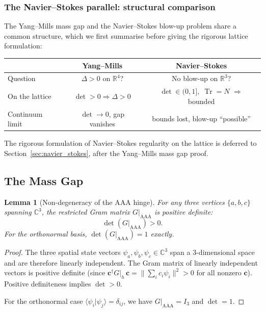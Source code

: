 \documentclass[12pt]{article}
\newtheorem{lemma}[theorem]{Lemma}
\theoremstyle{remark}
\theoremstyle{definition}
\newcommand{\CC}{\mathbb{C}}
\newcommand{\RR}{\mathbb{R}}
\newcommand{\tr}{\operatorname{Tr}}
\begin{document}
\subsubsection{The Navier--Stokes parallel: structural comparison}
\label{sec:navier_stokes_parallel}

The Yang--Mills mass gap and the Navier--Stokes blow-up problem share
a common structure, which we first summarise before giving the
rigorous lattice formulation:

\begin{center}
\begin{tabular}{lcc}
\hline
& Yang--Mills & Navier--Stokes \\
\hline
Question & $\Delta > 0$ on $\RR^4$? & No blow-up on $\RR^3$? \\
On the lattice & $\det > 0 \Rightarrow \Delta > 0$ &
  $\det \in (0,1],\;\tr = N$ $\Rightarrow$ bounded \\
Continuum limit & $\det \to 0$, gap vanishes &
  bounds lost, blow-up ``possible'' \\
\hline
\end{tabular}
\end{center}

The rigorous formulation of Navier--Stokes regularity on the lattice
is deferred to Section~\ref{sec:navier_stokes}, after the Yang--Mills
mass gap proof.

\subsection{The Mass Gap}
\label{sec:massgap}

\begin{lemma}[Non-degeneracy of the AAA hinge]
\label{lem:det}
For any three vertices $\{a, b, c\}$ spanning $\CC^3$, the
restricted Gram matrix $G|_{\mathrm{AAA}}$ is positive definite:
\begin{equation}
\det(G|_{\mathrm{AAA}}) > 0.
\end{equation}
For the orthonormal basis, $\det(G|_{\mathrm{AAA}}) = 1$ exactly.
\end{lemma}

\begin{proof}
The three spatial state vectors $\psi_a, \psi_b, \psi_c \in \CC^3$
span a 3-dimensional space and are therefore linearly independent.
The Gram matrix of linearly independent vectors is positive definite
(since $\mathbf{c}^\dagger G|_h\, \mathbf{c} =
\|\sum_i c_i \psi_i\|^2 > 0$ for all nonzero $\mathbf{c}$).
Positive definiteness implies $\det > 0$.

For the orthonormal case $\langle \psi_i | \psi_j \rangle = \delta_{ij}$,
we have $G|_{\mathrm{AAA}} = I_3$ and $\det = 1$.
\end{proof}
\end{document}
